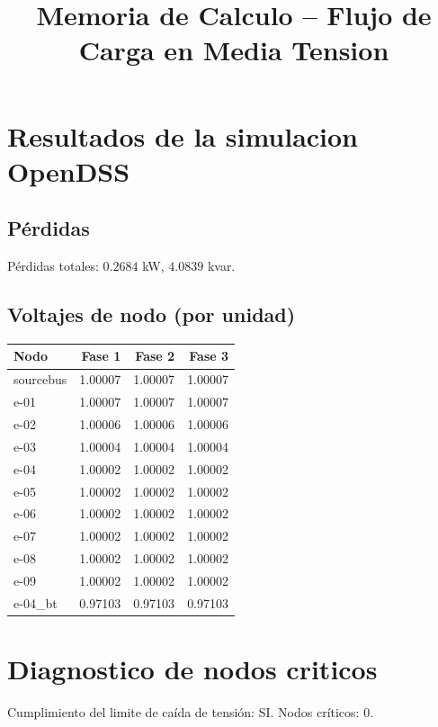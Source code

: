 \documentclass[11pt,a4paper]{article}
\title{Memoria de Calculo -- Flujo de Carga en Media Tension}
\begin{document}
\maketitle
\section{Resultados de la simulacion OpenDSS}
\subsection{Pérdidas}
Pérdidas totales: $0.2684$ kW, $4.0839$ kvar.
\subsection{Voltajes de nodo (por unidad)}
\begin{tabular}{lrrr}
\toprule
Nodo & Fase 1 & Fase 2 & Fase 3 \\
\midrule
sourcebus & 1.00007 & 1.00007 & 1.00007 \\
e-01 & 1.00007 & 1.00007 & 1.00007 \\
e-02 & 1.00006 & 1.00006 & 1.00006 \\
e-03 & 1.00004 & 1.00004 & 1.00004 \\
e-04 & 1.00002 & 1.00002 & 1.00002 \\
e-05 & 1.00002 & 1.00002 & 1.00002 \\
e-06 & 1.00002 & 1.00002 & 1.00002 \\
e-07 & 1.00002 & 1.00002 & 1.00002 \\
e-08 & 1.00002 & 1.00002 & 1.00002 \\
e-09 & 1.00002 & 1.00002 & 1.00002 \\
e-04_bt & 0.97103 & 0.97103 & 0.97103 \\
\bottomrule
\end{tabular}
\section{Diagnostico de nodos criticos}
Cumplimiento del limite de caída de tensión: SI. Nodos críticos: 0.
\end{document}
